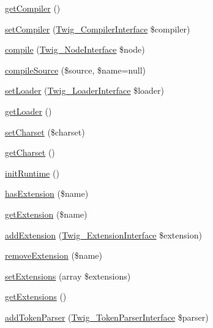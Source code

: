 \begin{DoxyCompactItemize}
\item 
\hyperlink{classTwig__Environment_a0998c3b47907b5883c5cb1fc83d721a4}{get\+Compiler} ()
\item 
\hyperlink{classTwig__Environment_a2d576a99dceca05a5d52aff4e04165f2}{set\+Compiler} (\hyperlink{interfaceTwig__CompilerInterface}{Twig\+\_\+\+Compiler\+Interface} \$compiler)
\item 
\hyperlink{classTwig__Environment_a0735f3c9921b582041cefa9ee7a9d61b}{compile} (\hyperlink{interfaceTwig__NodeInterface}{Twig\+\_\+\+Node\+Interface} \$node)
\item 
\hyperlink{classTwig__Environment_a44a55c855162b29c47faf77069ff5d16}{compile\+Source} (\$source, \$name=null)
\item 
\hyperlink{classTwig__Environment_a14b9f4d644d1e353a9fd9709679452d9}{set\+Loader} (\hyperlink{interfaceTwig__LoaderInterface}{Twig\+\_\+\+Loader\+Interface} \$loader)
\item 
\hyperlink{classTwig__Environment_a5e9cacc83c129a5199c256103c6d684d}{get\+Loader} ()
\item 
\hyperlink{classTwig__Environment_a7ad8792dc2e90e53017331debd831682}{set\+Charset} (\$charset)
\item 
\hyperlink{classTwig__Environment_ae8b31a143ee07a0122fd92e6325994fc}{get\+Charset} ()
\item 
\hyperlink{classTwig__Environment_a2fc774477aa20e55ec9336f4acb9c823}{init\+Runtime} ()
\item 
\hyperlink{classTwig__Environment_a74a37a83009919e9a083c50edfee71f9}{has\+Extension} (\$name)
\item 
\hyperlink{classTwig__Environment_a7d5b2dd4e5e5bc15a9048ebd3114f38a}{get\+Extension} (\$name)
\item 
\hyperlink{classTwig__Environment_ab5352720ff5983b39d4bac79b65c17e2}{add\+Extension} (\hyperlink{interfaceTwig__ExtensionInterface}{Twig\+\_\+\+Extension\+Interface} \$extension)
\item 
\hyperlink{classTwig__Environment_a13f0132c47718c48c49ce1e3f48c65f0}{remove\+Extension} (\$name)
\item 
\hyperlink{classTwig__Environment_a8ee9ff4a948fd3431a8541a238522b48}{set\+Extensions} (array \$extensions)
\item 
\hyperlink{classTwig__Environment_a349d6782dd7e28268faacde88a9f3ccf}{get\+Extensions} ()
\item 
\hyperlink{classTwig__Environment_aff04b5d1d673a9af499c459db1f5e13a}{add\+Token\+Parser} (\hyperlink{interfaceTwig__TokenParserInterface}{Twig\+\_\+\+Token\+Parser\+Interface} \$parser)

\end{DoxyCompactItemize}
